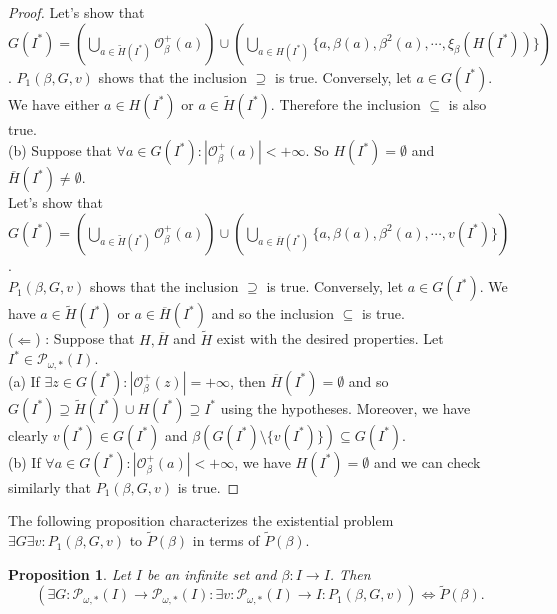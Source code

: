\documentclass[a4paper,11pt]{article}
\theoremstyle{plain}
\newtheorem{proposition}{Proposition}[section]
\theoremstyle{definition}
\theoremstyle{remark}
\begin{document}
\begin{proof}
Let's show that $G(I^*) = \left( \bigcup_{a \in \widetilde{H}(I^*)} \mathcal{O}^{+}_\beta(a) \right) \cup \left( \bigcup_{a \in H(I^*)} \{a, \beta(a), \beta^2(a), \cdots, \xi_\beta(H(I^*))\} \right)$. $P_1(\beta,G,v)$ shows that the inclusion $\supseteq$ is true. Conversely, let $a \in G(I^*)$.  We have either $a \in H(I^*)$ or $a \in \widetilde{H}(I^*)$. Therefore the inclusion $\subseteq$ is also true. \\
(b) Suppose that $\forall a \in G(I^*) : |\mathcal{O}^{+}_\beta(a)| < +\infty$. So $H(I^*) = \emptyset$ and $\overline{H}(I^*) \neq \emptyset$. \\
Let's show that $G(I^*) = \left( \bigcup_{a \in \widetilde{H}(I^*)} \mathcal{O}^{+}_\beta(a) \right) \cup \left( \bigcup_{a \in \overline{H}(I^*)} \{a, \beta(a), \beta^2(a), \cdots, v(I^*)\} \right)$. \\
$P_1(\beta,G,v)$ shows that the inclusion $\supseteq$ is true. Conversely, let $a \in G(I^*)$. We have $a \in \widetilde{H}(I^*)$ or $a \in \overline{H}(I^*)$ and so the inclusion $\subseteq$ is true. \\
($\Leftarrow$) : Suppose that $H, \overline{H}$ and $\widetilde{H}$ exist with the desired properties. Let $I^* \in \mathcal{P}_{\omega,*}(I)$. \\
(a) If $\exists z \in G(I^*) : |\mathcal{O}^{+}_\beta(z)| = +\infty$, then $\overline{H}(I^*) = \emptyset$ and so $G(I^*) \supseteq \widetilde{H}(I^*) \cup H(I^*) \supseteq I^*$ using the hypotheses. Moreover, we have clearly $v(I^*) \in G(I^*)$ and $\beta(G(I^*)\setminus \{v(I^*)\}) \subseteq G(I^*)$. \\
(b) If $\forall a \in G(I^*) : |\mathcal{O}^{+}_\beta(a)| < +\infty$, we have $H(I^*) = \emptyset$ and we can check similarly that $P_1(\beta,G,v)$ is true.
\end{proof}

The following proposition characterizes the existential problem $\exists G \exists v : P_1(\beta,G,v)$ to $\widetilde{P}(\beta)$ in terms of $\widetilde{P}(\beta)$.

\begin{proposition}
\label{propCharExistGvP1EquivPtilde}
Let $I$ be an infinite set and $\beta : I \to I$. Then
\[ \left( \exists G : \mathcal{P}_{\omega,*}(I) \to \mathcal{P}_{\omega,*}(I) : \exists v : \mathcal{P}_{\omega,*}(I) \to I : P_1(\beta,G,v) \right)  \Leftrightarrow \widetilde{P}(\beta). \]
\end{proposition}
\end{document}
